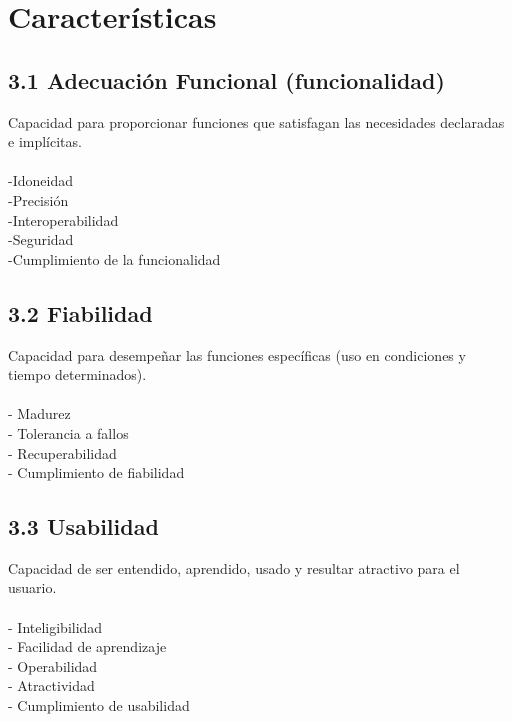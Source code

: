 \documentclass[https://www.overleaf.com/project/63761df255a8a9f4a15c3579
	letterpaper, %
	10pt, %
]{CSUniSchoolLabReport}
\begin{document}
    \section{Características}
        \subsection*{3.1 \hspace{0.5em} Adecuación Funcional (funcionalidad) }
            Capacidad para proporcionar funciones que satisfagan las necesidades declaradas e implícitas.
            \\\\
            -Idoneidad
            \\
            -Precisión
            \\
            -Interoperabilidad
            \\
            -Seguridad
            \\
            -Cumplimiento de la funcionalidad

        \subsection*{3.2 \hspace{0.5em} Fiabilidad}
            Capacidad para desempeñar las funciones específicas (uso en condiciones y tiempo determinados).
            \\\\
            - Madurez
            \\
            - Tolerancia a fallos
            \\
            - Recuperabilidad
            \\
            - Cumplimiento de fiabilidad

        \subsection*{3.3 \hspace{0.5em} Usabilidad}
            Capacidad de ser entendido, aprendido, usado y resultar atractivo para el usuario.
            \\\\
            - Inteligibilidad
            \\
            - Facilidad de aprendizaje
            \\
            - Operabilidad
            \\
            - Atractividad
            \\
            - Cumplimiento de usabilidad
\end{document}
